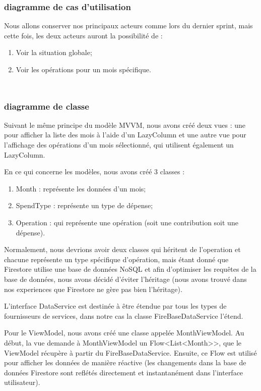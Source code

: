 \subsubsection{diagramme de cas d'utilisation}
Nous allons conserver nos principaux acteurs comme lors du dernier sprint, mais cette fois, les deux acteurs auront la possibilité de :
\begin{enumerate}
  \item Voir la situation globale;
  \item Voir les opérations pour un mois spécifique.
\end{enumerate}
\vfill
$ $

$ $
\subsubsection{diagramme de classe}
Suivant le même principe du modèle MVVM, nous avons créé deux vues : une pour afficher la liste des mois à l'aide d'un LazyColumn et une autre vue pour l'affichage des opérations d'un mois sélectionné, qui utilisent également un LazyColumn.

En ce qui concerne les modèles, nous avons créé 3 classes :
\begin{enumerate}
  \item Month : représente les données d'un mois;
  \item SpendType : représente un type de dépense;
  \item Operation : qui représente une opération (soit une contribution soit une dépense).
\end{enumerate}

Normalement, nous devrions avoir deux classes qui héritent de l'operation et chacune représente un type spécifique d'opération, mais étant donné que Firestore utilise une base de données NoSQL et afin d'optimiser les requêtes de la base de données, nous avons décidé d'éviter l'héritage (nous avons trouvé dans nos experiences que Firestore ne gère pas bien l'héritage).

L'interface DataService est destinée à être étendue par tous les types de fournisseurs de services, dans notre cas la classe FireBaseDataService l'étend.

Pour le ViewModel, nous avons créé une classe appelée MonthViewModel. Au début, la vue demande à MonthViewModel un Flow<List<Month>>, que le ViewModel récupère à partir du FireBaseDataService. Ensuite, ce Flow est utilisé pour afficher les données de manière réactive (les changements dans la base de données Firestore sont reflétés directement et instantanément dans l'interface utilisateur).
\vfill

$ $
\newpage
$ $
\newpage
